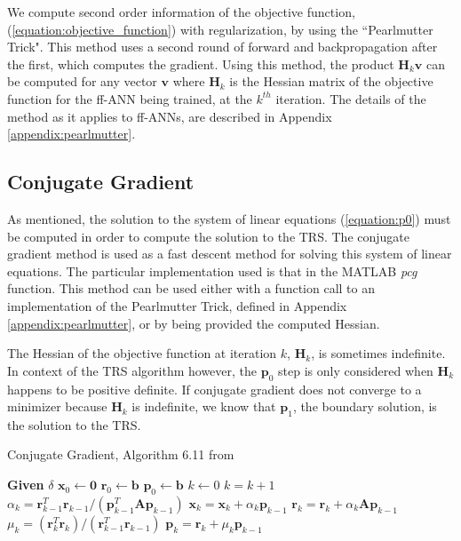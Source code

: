 \documentclass[letterpaper,12pt,titlepage,oneside,final]{book}
\begin{document}
	We compute second order information of the objective function, (\ref{equation:objective_function}) with regularization, by using the ``Pearlmutter Trick". This method uses a second round of forward and backpropagation after the first, which computes the gradient. Using this method, the product $\mathbf{H}_{k}\mathbf{v}$ can be computed for any vector $\mathbf{v}$ where $\mathbf{H}_{k}$ is the Hessian matrix of the objective function for the ff-ANN being trained, at the $k^{th}$ iteration. The details of the method as it applies to ff-ANNs, are described in Appendix \ref{appendix:pearlmutter}.
	
	\subsection{Conjugate Gradient}
	
	As mentioned, the solution to the system of linear equations (\ref{equation:p0}) must be computed in order to compute the solution to the TRS. The conjugate gradient method is used as a fast descent method for solving this system of linear equations. The particular implementation used is that in the MATLAB \textit{pcg} function. This method can be used either with a function call to an implementation of the Pearlmutter Trick, defined in Appendix \ref{appendix:pearlmutter}, or by being provided the computed Hessian.
	
	 The Hessian of the objective function at iteration $k$, $\mathbf{H}_{k}$, is sometimes indefinite. In context of the TRS algorithm however, the $\mathbf{p}_{0}$ step is only considered when $\mathbf{H}_{k}$ happens to be positive definite. If conjugate gradient does not converge to a minimizer because $\mathbf{H}_{k}$ is indefinite, we know that $\mathbf{p}_{1}$, the boundary solution, is the solution to the TRS.  
	  
	 \begin{algorithm}
	 	\caption{Conjugate Gradient, Algorithm 6.11 from \cite{demmel.book}}\label{algorithm:cg}
	 	\begin{algorithmic}[1]
	 		\State \textbf{Given} $\delta$ 
	 		\State $\mathbf{x}_{0} \gets \mathbf{0}$
	 		\State $\mathbf{r}_{0} \gets \mathbf{b}$
	 		\State $\mathbf{p}_{0} \gets \mathbf{b}$ 
	 		\State $k \gets 0$
	 		\State $k = k + 1$
	 		\State $\alpha_{k} = \mathbf{r}^{T}_{k-1}\mathbf{r}_{k-1}/(\mathbf{p}^{T}_{k-1}\mathbf{A}\mathbf{p}_{k-1})$
	 		\State $\mathbf{x}_{k} = \mathbf{x}_{k} + \alpha_{k}\mathbf{p}_{k-1}$
	 		\State $\mathbf{r}_{k} = \mathbf{r}_{k} + \alpha_{k}\mathbf{A}\mathbf{p}_{k-1}$ 
	 		\State $\mu_{k} = (\mathbf{r}^{T}_{k}\mathbf{r}_{k})/(\mathbf{r}_{k-1}^{T}\mathbf{r}_{k-1})$ 
	 		\State $\mathbf{p}_{k} = \mathbf{r}_{k} + \mu_{k}\mathbf{p}_{k-1}$
	 		\EndWhile 
	 		\EndProcedure
	 		\label{algorithm:cg}
	 	\end{algorithmic}
	 \end{algorithm}
		
\end{document}
